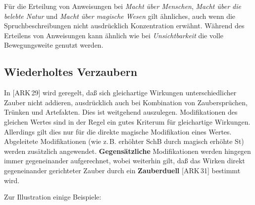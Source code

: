 \documentclass[10pt,a4paper,germanpar]{article}
\begin{document}
Für die Erteilung von Anweisungen bei \emph{Macht über Menschen},
\emph{Macht über die belebte Natur} und \emph{Macht über magische
Wesen} gilt ähnliches, auch wenn die Spruchbeschreibungen nicht
ausdrücklich Konzentration erwähnt. Während des Erteilens von
Anweisungen kann ähnlich wie bei \emph{Unsichtbarkeit} die volle
Bewegungsweite genutzt werden.

\subsection{Wiederholtes Verzaubern}

In [ARK\,29] wird geregelt, daß sich gleichartige Wirkungen
unterschiedlicher Zauber nicht addieren, ausdrücklich auch bei
Kombination von Zaubersprüchen, Trünken und Artefakten. Dies ist
weitgehend auszulegen. Modifikationen des gleichen Wertes sind in der
Regel ein gutes Kriterum für gleichartige Wirkungen. Allerdings gilt
dies nur für die direkte magische Modifikation eines
Wertes. Abgeleitete Modifikationen (wie z.\,B. erhöhter SchB durch
magisch erhöhte St) werden zusätzlich
angewendet. \textbf{Gegensätzliche} Modifikationen werden hingegen
immer gegeneinander aufgerechnet, wobei weiterhin gilt, daß das Wirken
direkt gegeneinander gerichteter Zauber durch ein \textbf{Zauberduell}
[ARK\,31] bestimmt wird.

Zur Illustration einige Beispiele:
\end{document}
